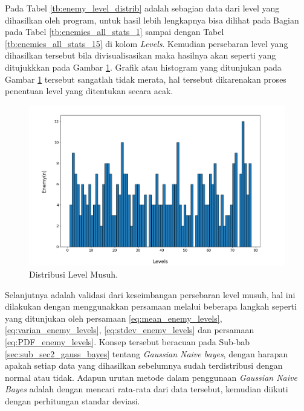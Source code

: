 Pada Tabel \ref{tb:enemy_level_distrib} adalah sebagian data dari level yang dihasilkan oleh program, untuk hasil lebih lengkapnya bisa dilihat pada Bagian  pada Tabel \ref{tb:enemies_all_stats_1} sampai dengan Tabel \ref{tb:enemies_all_stats_15} di kolom \textit{Levels}. Kemudian persebaran level yang dihasilkan tersebut bila divisualisasikan maka hasilnya akan seperti yang ditujukkkan pada Gambar \ref{fig:enemy_level_distrib}. Grafik atau histogram yang ditunjukan pada Gambar \ref{fig:enemy_level_distrib} tersebut sangatlah tidak merata, hal tersebut dikarenakan proses penentuan level yang ditentukan secara acak.
\vspace{1ex}

\begin{figure} [!h] \centering
	\includegraphics[scale=0.5]{img/EnemyLevelDistrib.png}
	\caption{Distribusi Level Musuh.}
	\label{fig:enemy_level_distrib}
\end{figure}
\vspace{1ex}

Selanjutnya adalah validasi dari keseimbangan persebaran level musuh, hal ini dilakukan dengan menggunakkan persamaan melalui beberapa langkah seperti yang ditunjukan oleh persamaan \ref{eq:mean_enemy_levels}, \ref{eq:varian_enemy_levels}, \ref{eq:stdev_enemy_levels} dan persamaan \ref{eq:PDF_enemy_levels}. Konsep tersebut beracuan pada Sub-bab \ref{sec:sub_sec2_gauss_bayes} tentang \textit{Gaussian Naive bayes}, dengan harapan apakah setiap data yang dihasilkan sebelumnya sudah terdistribusi dengan normal atau tidak. Adapun urutan metode dalam penggunaan \textit{Gaussian Naive Bayes} adalah dengan mencari rata-rata dari data tersebut, kemudian diikuti dengan perhitungan standar deviasi.
\vspace{1ex}


